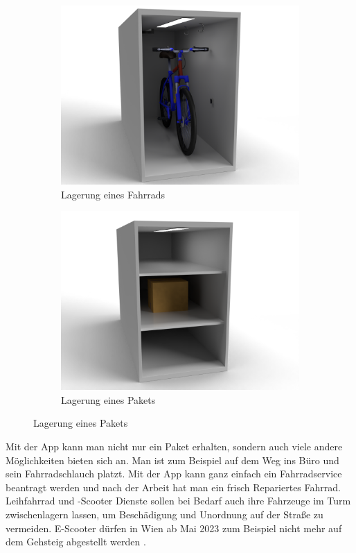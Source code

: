 \begin{figure}[H]
  \centering
  \begin{subfigure}{0.4\textwidth}
    \centering
    \includegraphics[width=\textwidth]{images/box_bike.png}
    \caption{Lagerung eines Fahrrads}
    \label{fig:storing_bike}
  \end{subfigure}
  \begin{subfigure}{0.4\textwidth}
    \centering
    \includegraphics[width=\textwidth]{images/box_item.png}
    \caption{Lagerung eines Pakets}
    \label{fig:storing_item}
  \end{subfigure}
\end{figure}

Mit der App kann man nicht nur ein Paket erhalten, sondern auch viele andere Möglichkeiten bieten sich an. Man ist zum Beispiel auf dem Weg ins Büro und sein Fahrradschlauch platzt. Mit der App kann ganz einfach ein Fahrradservice beantragt werden und nach der Arbeit hat man ein frisch Repariertes Fahrrad. Leihfahrrad und -Scooter Dienste sollen bei Bedarf auch ihre Fahrzeuge im Turm zwischenlagern lassen, um Beschädigung und Unordnung auf der Straße zu vermeiden. E-Scooter dürfen in Wien ab Mai 2023 zum Beispiel nicht mehr auf dem Gehsteig abgestellt werden .